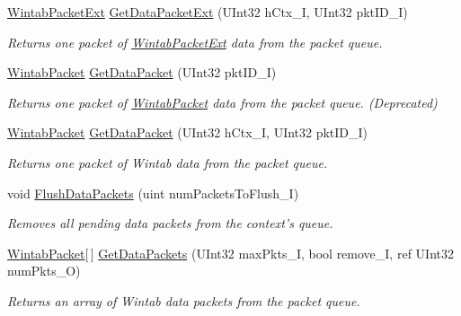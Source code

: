 \begin{DoxyCompactItemize}
\hyperlink{struct_wintab_d_n_1_1_wintab_packet_ext}{WintabPacketExt} \hyperlink{class_wintab_d_n_1_1_c_wintab_data_a49ceefded068a333238b412a725afeff}{GetDataPacketExt} (UInt32 hCtx\_\-I, UInt32 pktID\_\-I)
\begin{DoxyCompactList}\small\item\em Returns one packet of \hyperlink{struct_wintab_d_n_1_1_wintab_packet_ext}{WintabPacketExt} data from the packet queue. \item\end{DoxyCompactList}\item 
\hyperlink{struct_wintab_d_n_1_1_wintab_packet}{WintabPacket} \hyperlink{class_wintab_d_n_1_1_c_wintab_data_a3a4e0655e989c85debdff41b4d83d51b}{GetDataPacket} (UInt32 pktID\_\-I)
\begin{DoxyCompactList}\small\item\em Returns one packet of \hyperlink{struct_wintab_d_n_1_1_wintab_packet}{WintabPacket} data from the packet queue. (Deprecated) \item\end{DoxyCompactList}\item 
\hyperlink{struct_wintab_d_n_1_1_wintab_packet}{WintabPacket} \hyperlink{class_wintab_d_n_1_1_c_wintab_data_a465b6df3b3f753c362d91539ff5245f2}{GetDataPacket} (UInt32 hCtx\_\-I, UInt32 pktID\_\-I)
\begin{DoxyCompactList}\small\item\em Returns one packet of Wintab data from the packet queue. \item\end{DoxyCompactList}\item 
void \hyperlink{class_wintab_d_n_1_1_c_wintab_data_a6ccd2935c85d48a6c42d19825e6d9b65}{FlushDataPackets} (uint numPacketsToFlush\_\-I)
\begin{DoxyCompactList}\small\item\em Removes all pending data packets from the context's queue. \item\end{DoxyCompactList}\item 
\hyperlink{struct_wintab_d_n_1_1_wintab_packet}{WintabPacket}\mbox{[}$\,$\mbox{]} \hyperlink{class_wintab_d_n_1_1_c_wintab_data_a9ea9c89a0ca7d408d6bb6da822b8be5e}{GetDataPackets} (UInt32 maxPkts\_\-I, bool remove\_\-I, ref UInt32 numPkts\_\-O)
\begin{DoxyCompactList}\small\item\em Returns an array of Wintab data packets from the packet queue. \item\end{DoxyCompactList}\end{DoxyCompactItemize}


